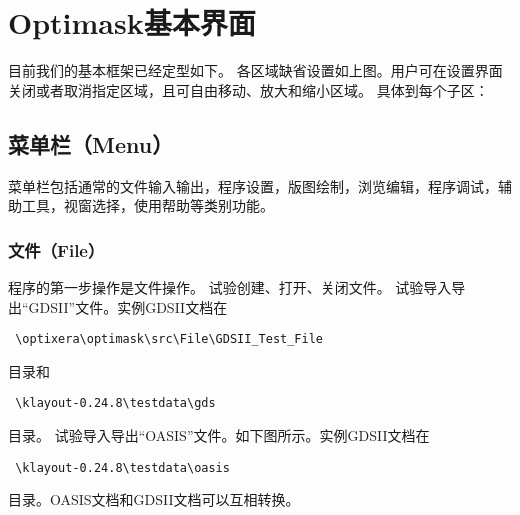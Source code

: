 
\resetdatestamp %


\chapter{Optimask基本界面} \label{ChMaskMainUI}

\pagestyle{fancy}
\fancyhead[RO,RE]{}
\fancyhead[LE]{\MakeUppercase{\leftmark}}
\fancyhead[LO]{\MakeUppercase{\rightmark}}
\fancyfoot[C]{\thepage}

目前我们的基本框架已经定型如下。
各区域缺省设置如上图。用户可在设置界面关闭或者取消指定区域，且可自由移动、放大和缩小区域。
具体到每个子区：

\section{菜单栏（Menu）} \label{SectMaskMenus}

菜单栏包括通常的文件输入输出，程序设置，版图绘制，浏览编辑，程序调试，辅助工具，视窗选择，使用帮助等类别功能。

\subsection{文件（File）} \label{SectMaskMenuFile} 
程序的第一步操作是文件操作。
试验创建、打开、关闭文件。
试验导入导出“GDSII”文件。实例GDSII文档在
\begin{verbatim} \optixera\optimask\src\File\GDSII_Test_File \end{verbatim} 目录和
\begin{verbatim} \klayout-0.24.8\testdata\gds \end{verbatim} 目录。
试验导入导出“OASIS”文件。如下图所示。实例GDSII文档在
\begin{verbatim} \klayout-0.24.8\testdata\oasis \end{verbatim} 目录。OASIS文档和GDSII文档可以互相转换。
